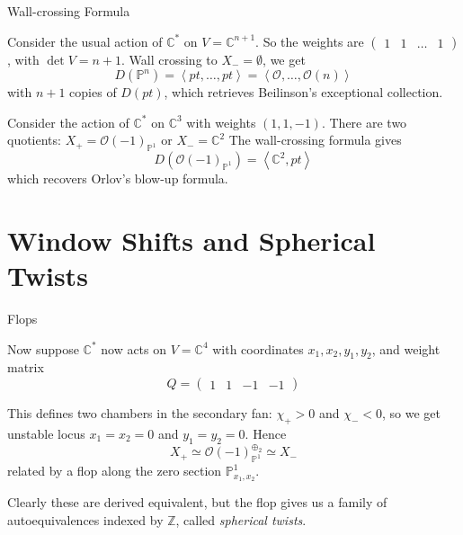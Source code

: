 \documentclass{beamer}
\begin{document}
\begin{frame}{Wall-crossing Formula}
    \begin{example}
Consider the usual action of $\mathbb{C}^*$ on $V = \mathbb{C}^{n+1}$. So the weights are $\begin{pmatrix}1 & 1 &\dots &1\end{pmatrix}$, with $\det V = n+1$. Wall crossing to $X_{-}=\emptyset$, we get $$D(\mathbb{P}^{n})= \left< pt, \dots,pt \right> = \left< \mathcal{O}, \dots,\mathcal{O}(n) \right>$$ with $n+1$ copies of $D(pt)$, which retrieves Beilinson's exceptional collection.
\end{example}
\begin{example}
Consider the action of $\mathbb{C}^{*}$ on $\mathbb{C}^3$ with weights $(1,1,-1)$. 
There are two quotients: $X_+ =  \mathcal{O}(-1)_{\mathbb{P}^{1}}$  or $X_{-}= \mathbb{C}^2$
The wall-crossing formula gives  $$D(\mathcal{O}(-1)_{\mathbb{P}^{1}})= \left< \mathbb{C}^{2}, pt \right> $$ which recovers Orlov's blow-up formula.

\end{example}
\end{frame}


\section{Window Shifts and Spherical Twists}

\begin{frame}{Flops}

Now suppose $\mathbb{C}^*$ now acts on $V = \mathbb{C}^4$  with coordinates $x_{1}, x_{2}, y_{1},y_{2}$, and weight matrix $$Q = \begin{pmatrix}1&1&-1&-1\end{pmatrix}$$ 

This defines two chambers in the secondary fan: $\chi_{+}>0$ and $\chi_{-}<0$, so we get unstable locus $x_{1}= x_{2}= 0$ and $y_{1}= y_{2}=0$. Hence $$
X_{+}\simeq \mathcal{O}(-1)_{\mathbb{P}^{1}}^{\oplus_{2}}\simeq X_-
$$related by a flop along the zero section $\mathbb{P}^1_{x_1 , x_2}$.
\vspace{0.3cm}

Clearly these are derived equivalent, but the flop gives us a family of autoequivalences indexed by $\mathbb Z $, called \emph{spherical twists}. 
\end{frame}
\end{document}
